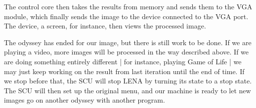 The control core then takes the results from memory and sends them to the
\ac{VGA} module, which finally sends the image to the device connected to the
\ac{VGA} port. The device, a screen, for instance, then views the processed
image.

The odyssey has ended for our image, but there is still work to be done. If we
are playing a video, more images will be processed in the way described
above. If we are doing something entirely different | for instance, playing Game
of Life | we may just keep working on the result from last iteration until the
end of time. If we stop before that, the \ac{SCU} will stop \ac{LENA} by turning
its state to a stop state. The \ac{SCU} will then set up the original menu, and
our machine is ready to let new images go on another odyssey with another
program.
